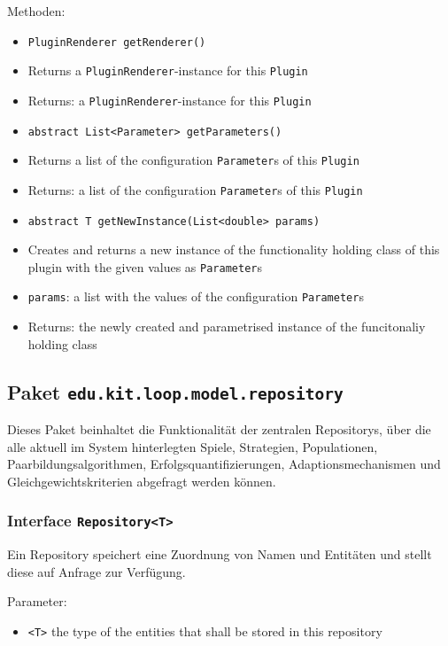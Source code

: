 \documentclass[parskip=full,11pt]{scrartcl}
\begin{document}
Methoden:
\begin{itemize}\itemsep -10pt
	\item \texttt{PluginRenderer getRenderer()}
	\item[] Returns a \texttt{PluginRenderer}-instance for this \texttt{Plugin}
	\item[] Returns: a \texttt{PluginRenderer}-instance for this \texttt{Plugin}
	
	\item \texttt{abstract List<Parameter> getParameters()}
	\item[] Returns a list of the configuration \texttt{Parameter}s of this \texttt{Plugin}
	\item[] Returns: a list of the configuration \texttt{Parameter}s of this \texttt{Plugin}
	
	\item \texttt{abstract T getNewInstance(List<double> params)}
	\item[] Creates and returns a new instance of the functionality holding class of this plugin with the given values as \texttt{Parameter}s
	\item[] \texttt{params}: a list with the values of the configuration \texttt{Parameter}s
	\item[] Returns: the newly created and parametrised instance of the funcitonaliy holding class
\end{itemize}

\subsection{Paket \texttt{edu.kit.loop.model.repository}}
Dieses Paket beinhaltet die Funktionalität der zentralen Repositorys, über die alle aktuell im System hinterlegten Spiele, Strategien, Populationen, Paarbildungsalgorithmen, Erfolgsquantifizierungen, Adaptionsmechanismen und Gleichgewichtskriterien abgefragt werden können.


\subsubsection{Interface \texttt{Repository<T>}}

Ein Repository speichert eine Zuordnung von Namen und Entitäten und stellt diese auf Anfrage zur Verfügung.

Parameter:
\begin{itemize}\itemsep -10pt
	\item \texttt{<T>} the type of the entities that shall be stored in this repository
\end{itemize}
\end{document}
